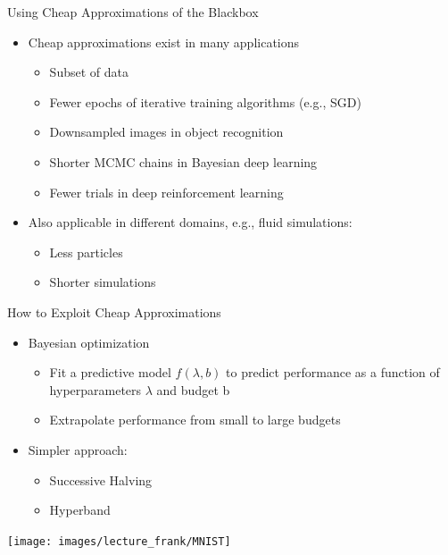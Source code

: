 \begin{frame}[c]{Using Cheap Approximations of the Blackbox}
\begin{itemize}
	\item \alert{Cheap approximations exist in many applications}
	\begin{itemize}
		\item Subset of data
		\item Fewer epochs of iterative training algorithms (e.g., SGD)
		\item Downsampled images in object recognition
		\item Shorter MCMC chains in Bayesian deep learning
		\item Fewer trials in deep reinforcement learning
	\end{itemize}
	\item Also applicable in different domains, e.g., fluid simulations:
	\begin{itemize}
		\item Less particles
		\item Shorter simulations
	\end{itemize}
\end{itemize}
\end{frame}
\begin{frame}[c]{How to Exploit Cheap Approximations}
\begin{itemize}
	\item \alert{Bayesian optimization} 
	\begin{itemize}
		\item Fit a predictive model $f(\lambda,b)$ to predict performance as a
		function of hyperparameters $\lambda$ and budget b
		\item Extrapolate performance from small to large budgets
	\end{itemize}
	\item \alert{Simpler approach}:
	\begin{itemize}
		\item Successive Halving 
		\item Hyperband 
	\end{itemize}
\end{itemize}
{\centering
\texttt{[image: images/lecture\_frank/MNIST]}
}
\end{frame}
